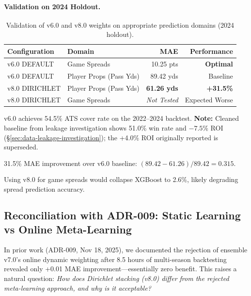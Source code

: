 \paragraph{Validation on 2024 Holdout.}
\begin{table}[htbp]
\centering
\caption[Dual-weight validation performance]{Validation of v6.0 and v8.0 weights on appropriate prediction domains (2024 holdout).}
\label{tab:dual-weight-validation}
\begin{threeparttable}
\begin{tabular}{@{}llrr@{}}
\toprule
\textbf{Configuration} & \textbf{Domain} & \textbf{MAE} & \textbf{Performance} \\
\midrule
v6.0 DEFAULT & Game Spreads & 10.25 pts & \textbf{Optimal}\tnote{a} \\
v6.0 DEFAULT & Player Props (Pass Yds) & 89.42 yds & Baseline \\
v8.0 DIRICHLET & Player Props (Pass Yds) & \textbf{61.26 yds} & \textbf{+31.5\%}\tnote{b} \\
v8.0 DIRICHLET & Game Spreads & \textit{Not Tested}\tnote{c} & Expected Worse \\
\bottomrule
\end{tabular}
\begin{tablenotes}
\footnotesize
\item[a] v6.0 achieves 54.5\% ATS cover rate on the 2022--2024 backtest. \textbf{Note:} Cleaned baseline from leakage investigation shows 51.0\% win rate and $-7.5$\% ROI (\S\ref{sec:data-leakage-investigation}); the +4.0\% ROI originally reported is superseded.
\item[b] 31.5\% MAE improvement over v6.0 baseline: $(89.42 - 61.26) / 89.42 = 0.315$.
\item[c] Using v8.0 for game spreads would collapse XGBoost to 2.6\%, likely degrading spread prediction accuracy.
\end{tablenotes}
\end{threeparttable}
\end{table}

\subsection{Reconciliation with ADR-009: Static Learning vs Online Meta-Learning}
\label{subsec:reconcile-adr009}

In prior work (ADR-009, Nov 18, 2025), we documented the rejection of ensemble v7.0's online dynamic weighting after 8.5 hours of multi-season backtesting revealed only +0.01 MAE improvement---essentially zero benefit. This raises a natural question: \emph{How does Dirichlet stacking (v8.0) differ from the rejected meta-learning approach, and why is it acceptable?}

